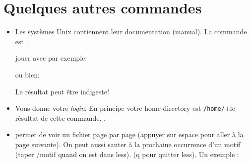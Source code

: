\section{Quelques autres commandes}
\begin{itemize}
\item Les systèmes Unix contiennent leur documentation (manual). La
  commande est .

  \exo{} jouer avec  par exemple:


  ou bien:

   Le résultat peut être indigeste!
\item {}

  Vous donne votre \textsl{login}. En principe votre home-directory
  est \texttt{/home/}$+$le résultat de cette commande. .
  
\item {} permet de voir un fichier page par page (appuyer sur
  espace pour aller à la page suivante). On peut aussi sauter à la
  prochaine occurrence d'un motif (taper \textsf{/motif} quand on est
  dans less). (\textsf{q pour
    quitter less}). Un exemple :

\end{itemize}

